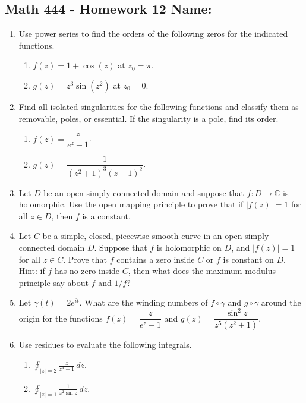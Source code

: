 \documentclass[11pt]{article}
\newcommand{\ds}{\displaystyle}
\newcommand{\C}{\mathbb{C}}
\begin{document}
\pagestyle{empty}
\subsection*{Math 444 - Homework 12 \hfill Name: \underline{\hspace*{2in}}}
\noindent
\begin{enumerate}
\item Use power series to find the orders of the following zeros for the indicated functions.
\begin{multicols}{2}
\begin{enumerate}
\item $f(z) = 1 + \cos(z)$ at $z_0 = \pi$.

\item $g(z) = z^3\sin(z^2)$ at $z_0 = 0$. 
\end{enumerate}
\end{multicols}
\vfill


\item Find all isolated singularities for the following functions and classify them as removable, poles, or essential.  If the singularity is a pole, find its order. 
\begin{multicols}{2}
\begin{enumerate}
\item $f(z) = \dfrac{z}{e^z - 1}$.

\item $g(z) = \dfrac{1}{(z^2 + 1)^3 (z-1)^2}$. 
\end{enumerate}
\end{multicols}
\vfill

\item Let $D$ be an open simply connected domain and suppose that $f: D \rightarrow \C$ is holomorphic.  Use the open mapping principle to prove that if $|f(z)| = 1$ for all $z \in D$, then $f$ is a constant. 
\vfill

\item Let $C$ be a simple, closed, piecewise smooth curve in an open simply connected domain $D$.  Suppose that $f$ is holomorphic on $D$, and $|f(z)| = 1$ for all $z \in C$.  Prove that $f$ contains a zero inside $C$ or $f$ is constant on $D$.  Hint: if $f$ has no zero inside $C$, then what does the maximum modulus principle say about $f$ and $1/f$? 
\vfill

\item Let $\gamma(t) = 2 e^{it}$.  What are the winding numbers of $f \circ \gamma$ and $g \circ \gamma$ around the origin for the functions $f(z) = \dfrac{z}{e^z - 1}$ and $g(z) = \dfrac{\sin^2 z}{z^5(z^2+1)}$. 
\vfill

\newpage 
\item Use residues to evaluate the following integrals. 
\begin{multicols}{2}
\begin{enumerate}
\item $\ds \oint_{|z| = 2} \frac{z}{z^4 - 1} \, dz$.

\item $\ds \oint_{|z| = 1} \frac{1}{z^2 \sin z} \, dz$. 
\end{enumerate}
\end{multicols}
\vfill
\end{enumerate}
\end{document}
